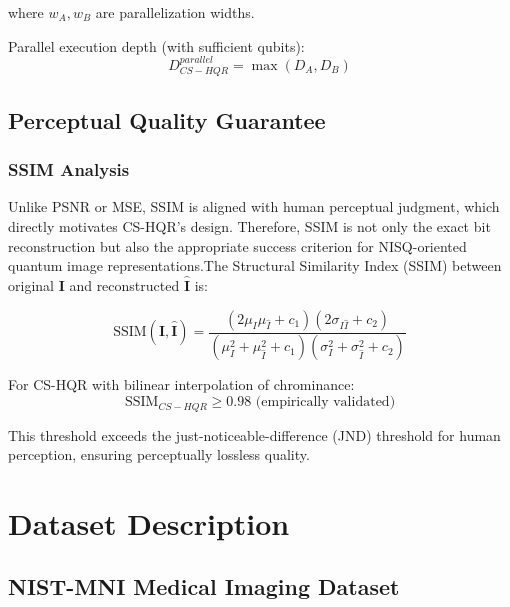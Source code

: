 \documentclass[11pt,a4paper]{article}
\begin{document}
where $w_A, w_B$ are parallelization widths.

Parallel execution depth (with sufficient qubits):
\begin{equation}
D_{CS-HQR}^{parallel} = \max(D_A, D_B)
\label{eq:parallel_depth}
\end{equation}

\subsection{Perceptual Quality Guarantee}

\subsubsection{SSIM Analysis}

Unlike PSNR or MSE, SSIM is aligned with human perceptual judgment, which directly motivates CS-HQR’s design. Therefore, SSIM is not only the exact bit reconstruction but also the appropriate success criterion for NISQ-oriented quantum image representations.The Structural Similarity Index (SSIM) between original $\mathbf{I}$ and reconstructed $\hat{\mathbf{I}}$ is:

\begin{equation}
\text{SSIM}(\mathbf{I}, \hat{\mathbf{I}}) = \frac{(2\mu_I\mu_{\hat{I}} + c_1)(2\sigma_{I\hat{I}} + c_2)}{(\mu_I^2 + \mu_{\hat{I}}^2 + c_1)(\sigma_I^2 + \sigma_{\hat{I}}^2 + c_2)}
\label{eq:ssim}
\end{equation}

For CS-HQR with bilinear interpolation of chrominance:
\begin{equation}
\text{SSIM}_{CS-HQR} \geq 0.98 \text{ (empirically validated)}
\label{eq:ssim_bound}
\end{equation}

This threshold exceeds the just-noticeable-difference (JND) threshold for human perception, ensuring perceptually lossless quality.

\section{Dataset Description}
\label{sec:dataset}

\subsection{NIST-MNI Medical Imaging Dataset}
\label{subsec:nist_mni}
\end{document}
